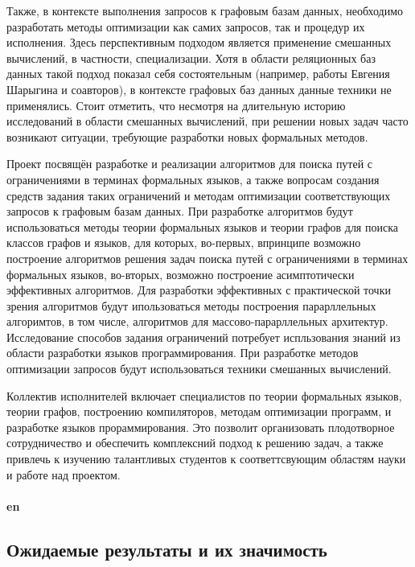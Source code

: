 \documentclass[12pt]{article}  %
\theoremstyle{remark}
\begin{document}
Также, в контексте выполнения запросов к графовым базам данных, необходимо разработать методы оптимизации как самих запросов, так и процедур их исполнения.
Здесь перспективным подходом является применение смешанных вычислений, в частности, специализации.
Хотя в области реляционных баз данных такой подход показал себя состоятельным (например, работы Евгения Шарыгина и соавторов), в контексте графовых баз данных данные техники не применялись.
Стоит отметить, что несмотря на длительную историю исследований в области смешанных вычислений, при решении новых задач часто возникают ситуации, требующие разработки новых формальных методов.

Проект посвящён разработке и реализации алгоритмов для поиска путей с ограничениями в терминах формальных языков, а также вопросам создания средств задания таких ограничений и методам оптимизации соответствующих запросов к графовым базам данных.
При разработке алгоритмов будут использоваться методы теории формальных языков и теории графов для поиска классов графов и языков, для которых, во-первых, впринципе возможно построение алгоритмов решения задач поиска путей с ограничениями в терминах формальных языков, во-вторых,  возможно построение асимптотически эффективных алгоритмов.
Для разработки эффективных с практической точки зрения алгоритмов будут ипользоваться методы построения парарллельных алгоримтов, в том числе, алгоритмов для массово-парарллельных архитектур.
Исследование способов задания ограничений потребует испльзования знаний из области разработки языков программирования.
При разработке методов оптимизации запросов будут использоваться техники смешанных вычислений.

Коллектив исполнителей включает специалистов по теории формальных языков, теории графов, построению компиляторов, методам оптимизации программ, и разработке языков прораммирования.
Это позволит организовать плодотворное сотрудничество и обеспечить комплексний подход к решению задач, а также привлечь к изучению талантливых студентов к соответтсвующим областям науки и работе над проектом.
\\
\\
\textbf{en}\\

\subsection{Ожидаемые результаты и их значимость}
\end{document}
